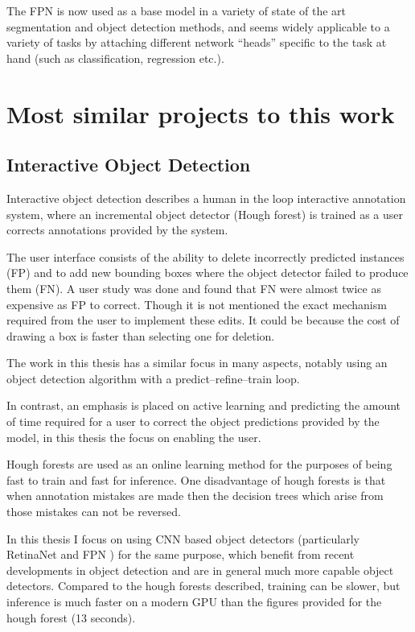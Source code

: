 The \gls{FPN} is now used as a base model in a variety of state of the art segmentation and object detection methods, and seems widely applicable to a variety of tasks by attaching different network ``heads'' specific to the task at hand (such as classification, regression etc.).




\section {Most similar projects to this work}
\label{sec:closest}

\subsection {Interactive Object Detection \cite{Yao2012}}
Interactive object detection \cite{Yao2012} describes a human in the loop interactive annotation system, where an incremental object detector (Hough forest) is trained as a user corrects annotations provided by the system. 

The user interface consists of the ability to delete incorrectly predicted instances (\gls{FP}) and to add new bounding boxes where the object detector failed to produce them (\gls{FN}). A user study was done and found that \gls{FN} were almost twice as expensive as \gls{FP} to correct. Though it is not mentioned the exact mechanism required from the user to implement these edits. It could be because the cost of drawing a box is faster than selecting one for deletion.


The work in this thesis has a similar focus in many aspects, notably using an object detection algorithm with a predict--refine--train loop. 

In contrast, an emphasis is placed on active learning and predicting the amount of time required for a user to correct the object predictions provided by the model, in this thesis the focus on enabling the user. 

Hough forests \cite{Gall2011} are used as an online learning method for the purposes of being fast to train and fast for inference. One disadvantage of hough forests is that when annotation mistakes are made then the decision trees which arise from those mistakes can not be reversed. 

In this thesis I focus on using \gls{CNN} based object detectors (particularly RetinaNet \cite{Lin2017} and \gls{FPN} \cite{Lin2017a}) for the same purpose, which benefit from recent developments in object detection and are in general much more capable object detectors. Compared to the hough forests described, training can be slower, but inference is much faster on a modern \gls{GPU} than the figures provided for the hough forest (13 seconds).



